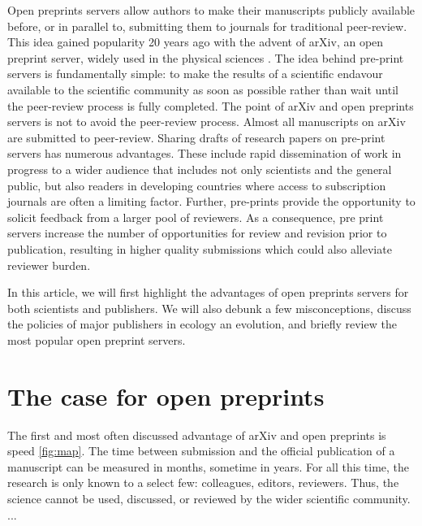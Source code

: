 \documentclass[letterpaper,twocolumn,superscriptaddress,showkeys]{revtex4}
\begin{document}
Open preprints servers allow authors to make their manuscripts publicly available before, or in parallel to, submitting them to journals for traditional peer-review. This idea gained popularity 20 years ago with the advent of arXiv, an open preprint server, widely used in the physical sciences \cite{gin11}. The idea behind pre-print servers is fundamentally simple: to make the results of a scientific endavour available to the scientific community as soon as possible rather than wait until the peer-review process is fully completed. The point of arXiv and open preprints servers is not to avoid the peer-review process. Almost all manuscripts on arXiv are submitted to peer-review.  Sharing drafts of research papers on pre-print servers has numerous advantages. These include rapid dissemination of work in progress to a wider audience that includes not only scientists and the general public, but also readers in developing countries where access to subscription journals are often a limiting factor. Further, pre-prints provide the opportunity to solicit feedback from a larger pool of reviewers. As a consequence, pre print servers increase the number of opportunities for review and revision prior to publication, resulting in higher quality submissions which could also alleviate reviewer burden.

In this article, we will first highlight the advantages of open preprints
servers for both scientists and publishers. We will also debunk a few
misconceptions, discuss the policies of major publishers in ecology an
evolution, and briefly review the most popular open preprint servers.

\section{The case for open preprints}

The first and most often discussed advantage of arXiv and open preprints is
speed \ref{fig:map}. The time between submission and the official publication of
a manuscript can be measured in months, sometime in years. For all this time,
the research is only known to a select few: colleagues, editors, reviewers.
Thus, the science cannot be used, discussed, or reviewed by the wider scientific
community. ...

\end{document}
